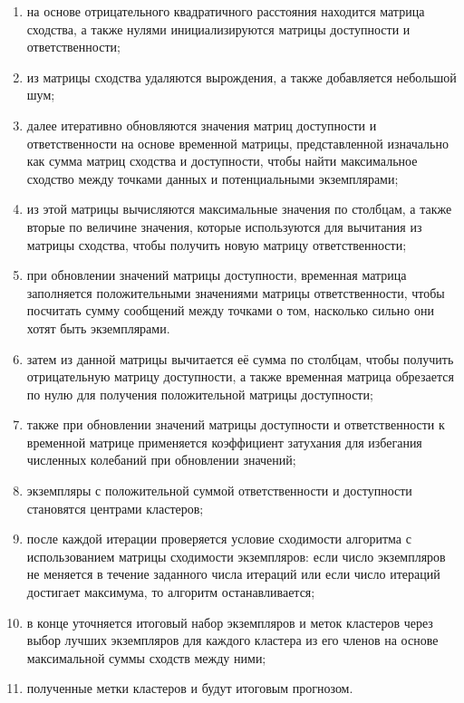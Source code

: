 \begin{enumerate}
    \item на основе отрицательного квадратичного расстояния находится матрица сходства, а также нулями инициализируются матрицы доступности и ответственности;

    \item из матрицы сходства удаляются вырождения, а также добавляется небольшой шум;

    \item далее итеративно обновляются значения матриц доступности и ответственности на основе временной матрицы, представленной изначально как сумма матриц сходства и доступности, чтобы найти максимальное сходство между точками данных и потенциальными экземплярами;

    \item из этой матрицы вычисляются максимальные значения по столбцам, а также вторые по величине значения, которые используются для вычитания из матрицы сходства, чтобы получить новую матрицу ответственности;

    \item при обновлении значений матрицы доступности, временная матрица заполняется положительными значениями матрицы ответственности, чтобы посчитать сумму сообщений между точками о том, насколько сильно они хотят быть экземплярами.

    \item затем из данной матрицы вычитается её сумма по столбцам, чтобы получить отрицательную матрицу доступности, а также временная матрица обрезается по нулю для получения положительной матрицы доступности;

    \item также при обновлении значений матрицы доступности и ответственности к временной матрице применяется коэффициент затухания для избегания численных колебаний при обновлении значений;

    \item экземпляры с положительной суммой ответственности и доступности становятся центрами кластеров;

    \item после каждой итерации проверяется условие сходимости алгоритма с использованием матрицы сходимости экземпляров: если число экземпляров не меняется в течение заданного числа итераций или если число итераций достигает максимума, то алгоритм останавливается;

    \item в конце уточняется итоговый набор экземпляров и меток кластеров через выбор лучших экземпляров для каждого кластера из его членов на основе максимальной суммы сходств между ними;

    \item полученные метки кластеров и будут итоговым прогнозом.

\end{enumerate}

